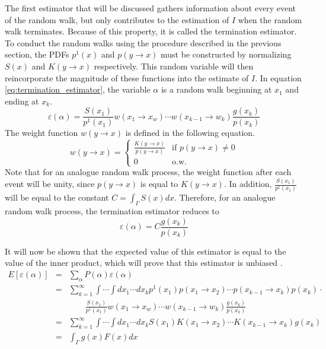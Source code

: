 The first estimator that will be discussed gathers information about every
event of the random walk, but only contributes to the estimation of $I$ when
the random walk terminates. Because of this property, it is called the
termination estimator. To conduct the random walks using the procedure
described in the previous section, the PDFs $p^1(x)$ and $p(y \to x)$ must be 
constructed by normalizing $S(x)$ and $K(y \to x)$ respectively. This random
variable will then reincorporate the magnitude of these functions into
the estimate of $I$. In equation \ref{eq:termination_estimator}, the variable 
$\alpha$ is a random walk beginning at $x_1$ and ending at $x_k$.
\begin{equation}
  \varepsilon(\alpha) = \frac{S(x_1)}{p^1(x_1)}w(x_1 \to x_w)\cdots 
  w(x_{k-1} \to w_k)\frac{g(x_k)}{p(x_k)}
  \label{eq:termination_estimator}
\end{equation}
The weight function $w(y \to x)$ is defined in the following equation.
\begin{equation}
  w(y \to x) = 
  \begin{cases}
    \frac{K(y \to x)}{p(y \to x)} & \text{if } p(y \to x) \neq 0 \\
    0 & \text{o.w.}
  \end{cases}
\end{equation}
Note that for an analogue random walk process, the weight function after each
event will be unity, since $p(y \to x)$ is equal to $K(y \to x)$. In addition,
$\frac{S(x_1)}{p^1(x_1)}$ will be equal to the constant 
$C = \int_{\Gamma} S(x)dx$. Therefore, for an analogue random walk process, the
termination estimator reduces to
\begin{equation*}
  \varepsilon(\alpha) = C \frac{g(x_k)}{p(x_k)}
\end{equation*}

It will now be shown that the expected value of this estimator is equal to the 
value of the inner product, which will prove that this estimator is unbiased 
\citep{spanier_monte_1969}.
\begin{eqnarray}
  E\left[\varepsilon(\alpha)\right] & = & \sum_{\alpha} 
  P(\alpha)\varepsilon(\alpha) \nonumber \\
  & = & \sum_{k=1}^{\infty} \int \cdots \int dx_1 \cdots dx_k p^1(x_1)
  p(x_1 \to x_2) \cdots p(x_{k-1} \to x_k)p(x_k) \cdot \nonumber \\
  & & \qquad \frac{S(x_1)}{p^1(x_1)}w(x_1 \to x_w)\cdots 
  w(x_{k-1} \to w_k)\frac{g(x_k)}{p(x_k)} \nonumber \\
  & = & \sum_{k=1}^{\infty} \int \cdots \int dx_1 \cdots dx_k S(x_1)K(x_1 \to x_2)
  \cdots K(x_{k-1} \to x_k)g(x_k) \nonumber \\
  & = & \int_{\Gamma} g(x)F(x)dx \nonumber  
\end{eqnarray}

